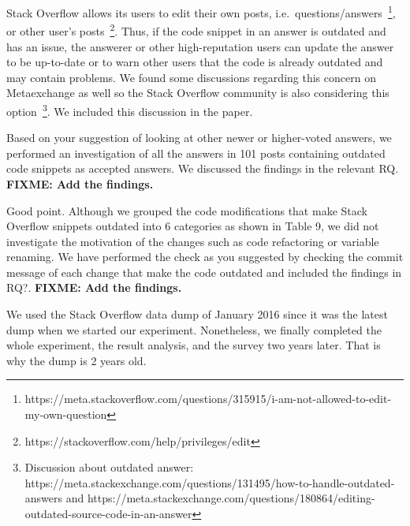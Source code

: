 \documentclass[a4paper,twoside,10pt]{reviewresponse}
\newcommand\FIXME[1]{{\color{red}\textbf{FIXME: #1}}}
\begin{document}
Stack Overflow allows its users to edit their own posts, i.e.~questions/answers~\footnote{https://meta.stackoverflow.com/questions/315915/i-am-not-allowed-to-edit-my-own-question}, or other user's posts~\footnote{https://stackoverflow.com/help/privileges/edit}. Thus, if the code snippet in an answer is outdated and has an issue, the answerer or other high-reputation users can update the answer to be up-to-date or to warn other users that the code is already outdated and may contain problems. We found some discussions regarding this concern on Metaexchange as well so the Stack Overflow community is also considering this option~\footnote{Discussion about outdated answer: https://meta.stackexchange.com/questions/131495/how-to-handle-outdated-answers and https://meta.stackexchange.com/questions/180864/editing-outdated-source-code-in-an-answer}. We included this discussion in the paper.

Based on your suggestion of looking at other newer or higher-voted answers, we performed an investigation of all the answers in 101 posts containing outdated code snippets as accepted answers. We discussed the findings in the relevant RQ. \FIXME{Add the findings.}
		
		

Good point. Although we grouped the code modifications that make Stack Overflow snippets outdated into 6 categories as shown in Table 9, we did not investigate the motivation of the changes such as code refactoring or variable renaming. We have performed the check as you suggested by checking the commit message of each change that make the code outdated and included the findings in RQ?. \FIXME{Add the findings.}


We used the Stack Overflow data dump of January 2016 since it was the latest dump when we started our experiment. Nonetheless, we finally completed the whole experiment, the result analysis, and the survey two years later. That is why the dump is 2 years old.
\end{document}
